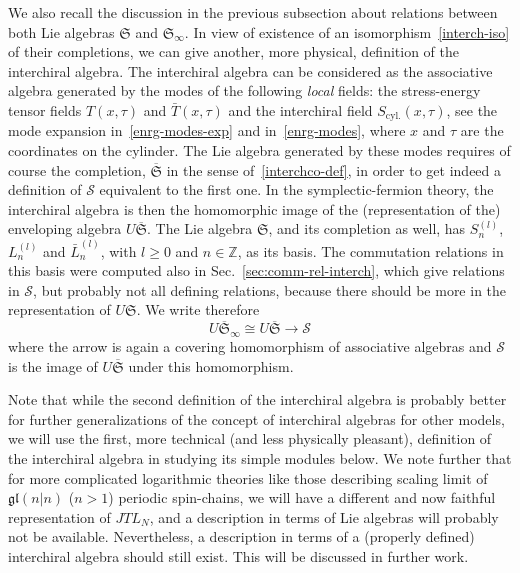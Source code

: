 \documentclass[11pt]{article}
\newcommand{\JTL}[1]{JTL_{#1}}
\newcommand{\oZ}{\mathbb{Z}}
\newcommand{\interLie}{\mathfrak{S}}
\newcommand{\interch}{\interLie}
\newcommand{\interchco}{\overline{\interLie}}
\newcommand{\interchalg}{\mathcal{S}}
\newcommand{\interinfin}{\interLie_{\infty}}
\newcommand{\interinfinco}{\overline{\interLie}_{\infty}}
\newcommand{\gl}{\mathfrak{gl}}
\newcommand{\enrg}{S}
\newcommand{\virm}[1]{L^{(#1)}}
\newcommand{\bvirm}[1]{\bar{L}^{(#1)}}
\newcommand{\enrgcyl}{\enrg_{\text{cyl.}}}
\theoremstyle{definition}
\begin{document}
 We also recall the discussion in the previous subsection about relations between both  Lie algebras $\interch$ and $\interinfin$. In view of existence of an isomorphism~\eqref{interch-iso} of their completions, we can give another, more physical, definition of the interchiral algebra.
The interchiral algebra can be considered as the associative algebra  generated by the
modes of the following {\it local} fields: the stress-energy tensor fields $T(x,\tau)$ and $\bar{T}(x,\tau)$ and the interchiral field $\enrgcyl(x,\tau)$, see the mode expansion in~\eqref{enrg-modes-exp} and in~\eqref{enrg-modes}, where $x$ and $\tau$ are the coordinates on the cylinder.  The Lie algebra generated by these  modes requires of course the completion, $\interchco$ in the sense of~\eqref{interchco-def}, in order to get indeed a definition of $\interchalg$ equivalent to the first one.
In the symplectic-fermion theory, the interchiral algebra  is  then the homomorphic image of the (representation of the) enveloping algebra $U \interchco$.  The Lie algebra $\interch$, and its completion as well, has
 $\enrg^{(l)}_n$, $\virm{l}_n$ and $\bvirm{l}_n$, with $l\geq0$ and $n\in\oZ$, as its basis. The commutation relations in this basis were computed also in Sec.~\ref{sec:comm-rel-interch}, which give  relations in $\interchalg$, but probably not all defining relations, because there should be more  in the representation of $U\interch$. We  write therefore
\begin{equation}\label{Uinterch-hom}
 U\interinfinco \cong  U\interchco\longrightarrow\interchalg
\end{equation}
where the arrow is again a covering homomorphism of associative algebras and $\interchalg$ is the image of $U\interchco$ under this homomorphism.


Note that while the second definition of the interchiral algebra is probably better for further generalizations of the concept of interchiral algebras for other models, we will use the first, more technical (and less physically pleasant), definition of the interchiral algebra in studying its simple modules below.
We note
 further
 that for more complicated logarithmic theories like those describing scaling limit of $\gl(n|n)$ ($n>1$) periodic spin-chains, we will have a different and now faithful representation of $\JTL{N}$, and a description in terms of Lie algebras will probably not be available. Nevertheless, a description in terms of a (properly defined)  interchiral algebra should still exist. This will be discussed in further work.
\end{document}
